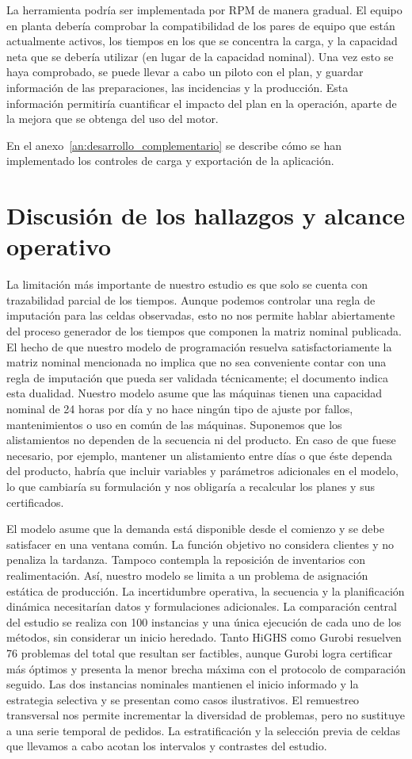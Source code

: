 \documentclass[12pt,a4paper,oneside]{article}
\begin{document}
La herramienta podría ser implementada por RPM de manera gradual. El equipo en planta debería comprobar la compatibilidad de los pares de equipo que están actualmente activos, los tiempos en los que se concentra la carga, y la capacidad neta que se debería utilizar (en lugar de la capacidad nominal). Una vez esto se haya comprobado, se puede llevar a cabo un piloto con el plan, y guardar información de las preparaciones, las incidencias y la producción. Esta información permitiría cuantificar el impacto del plan en la operación, aparte de la mejora que se obtenga del uso del motor.

En el anexo~\ref{an:desarrollo_complementario} se describe cómo se han implementado los controles de carga y exportación de la aplicación.


\section{Discusión de los hallazgos y alcance operativo}
La limitación más importante de nuestro estudio es que solo se cuenta con trazabilidad parcial de los tiempos. Aunque podemos controlar una regla de imputación para las celdas observadas, esto no nos permite hablar abiertamente del proceso generador de los tiempos que componen la matriz nominal publicada. El hecho de que nuestro modelo de programación resuelva satisfactoriamente la matriz nominal mencionada no implica que no sea conveniente contar con una regla de imputación que pueda ser validada técnicamente; el documento indica esta dualidad.
Nuestro modelo asume que las máquinas tienen una capacidad nominal de 24 horas por día y no hace ningún tipo de ajuste por fallos, mantenimientos o uso en común de las máquinas. Suponemos que los alistamientos no dependen de la secuencia ni del producto. En caso de que fuese necesario, por ejemplo, mantener un alistamiento entre días o que éste dependa del producto, habría que incluir variables y parámetros adicionales en el modelo, lo que cambiaría su formulación y nos obligaría a recalcular los planes y sus certificados.

El modelo asume que la demanda está disponible desde el comienzo y se debe satisfacer en una ventana común. La función objetivo no considera clientes y no penaliza la tardanza. Tampoco contempla la reposición de inventarios con realimentación. Así, nuestro modelo se limita a un problema de asignación estática de producción. La incertidumbre operativa, la secuencia y la planificación dinámica necesitarían datos y formulaciones adicionales. La comparación central del estudio se realiza con 100 instancias y una única ejecución de cada uno de los métodos, sin considerar un inicio heredado. Tanto HiGHS como Gurobi resuelven 76 problemas del total que resultan ser factibles, aunque Gurobi logra certificar más óptimos y presenta la menor brecha máxima con el protocolo de comparación seguido. Las dos instancias nominales mantienen el inicio informado y la estrategia selectiva y se presentan como casos ilustrativos. El remuestreo transversal nos permite incrementar la diversidad de problemas, pero no sustituye a una serie temporal de pedidos. La estratificación y la selección previa de celdas que llevamos a cabo acotan los intervalos y contrastes del estudio.
\end{document}
